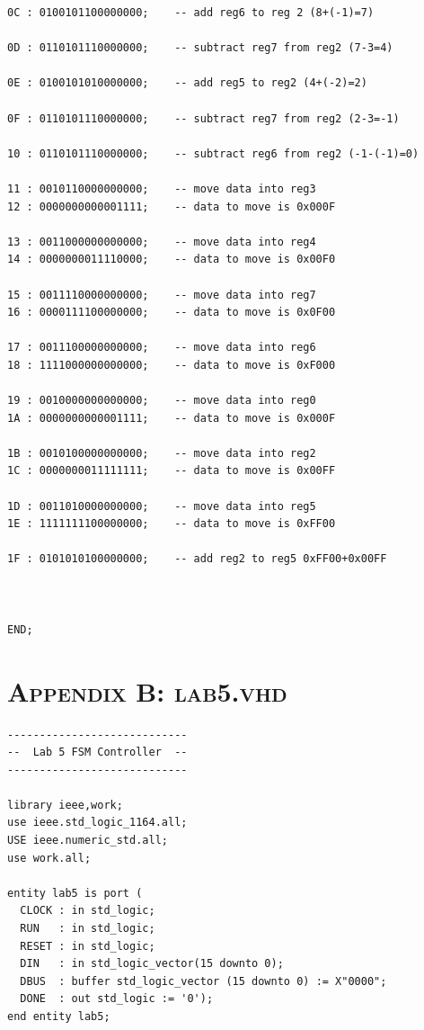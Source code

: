 \documentclass[11pt]{report}
\begin{document}
\begin{spacing}{1.5}
\begin{lstlisting}
0C : 0100101100000000;    -- add reg6 to reg 2 (8+(-1)=7)

0D : 0110101110000000;    -- subtract reg7 from reg2 (7-3=4)

0E : 0100101010000000;    -- add reg5 to reg2 (4+(-2)=2)

0F : 0110101110000000;    -- subtract reg7 from reg2 (2-3=-1)

10 : 0110101110000000;    -- subtract reg6 from reg2 (-1-(-1)=0)

11 : 0010110000000000;    -- move data into reg3
12 : 0000000000001111;    -- data to move is 0x000F

13 : 0011000000000000;    -- move data into reg4
14 : 0000000011110000;    -- data to move is 0x00F0

15 : 0011110000000000;    -- move data into reg7
16 : 0000111100000000;    -- data to move is 0x0F00

17 : 0011100000000000;    -- move data into reg6
18 : 1111000000000000;    -- data to move is 0xF000

19 : 0010000000000000;    -- move data into reg0
1A : 0000000000001111;    -- data to move is 0x000F

1B : 0010100000000000;    -- move data into reg2
1C : 0000000011111111;    -- data to move is 0x00FF

1D : 0011010000000000;    -- move data into reg5
1E : 1111111100000000;    -- data to move is 0xFF00

1F : 0101010100000000;    -- add reg2 to reg5 0xFF00+0x00FF



END;
\end{lstlisting}

\chapter*{\scshape Appendix B: lab5.vhd}
\label{app:a}
\vspace{15px}
\begin{lstlisting}
----------------------------
--  Lab 5 FSM Controller  --
----------------------------

library ieee,work;
use ieee.std_logic_1164.all;
USE ieee.numeric_std.all;
use work.all;

entity lab5 is port (
  CLOCK : in std_logic;
  RUN   : in std_logic;
  RESET : in std_logic;
  DIN   : in std_logic_vector(15 downto 0);
  DBUS  : buffer std_logic_vector (15 downto 0) := X"0000"; 
  DONE  : out std_logic := '0');
end entity lab5;


\end{lstlisting}
\end{spacing}
\end{document}
